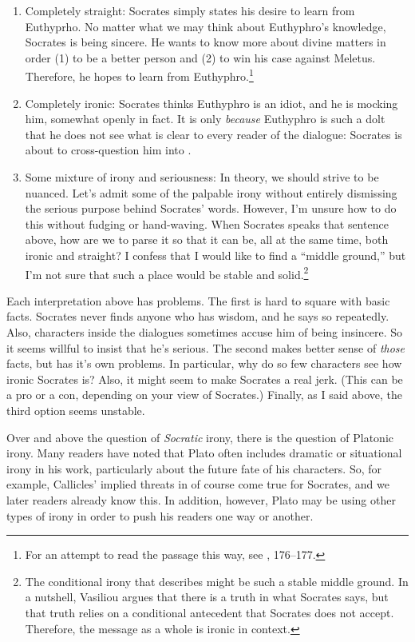 \documentclass[11pt]{article}
\begin{document}
\begin{enumerate}

    \item Completely straight: Socrates simply states his desire to learn from Euthyprho.  No matter what we may think about Euthyphro's knowledge, Socrates is being sincere.  He wants to know more about divine matters in order (1) to be a better person and (2) to win his case against Meletus.  Therefore, he hopes to learn from Euthyphro.\footnote{For an attempt to read the passage this way, see \citet{wolfsdorf2007}, 176--177.}

    \item Completely ironic: Socrates thinks Euthyphro is an idiot, and he is mocking him, somewhat openly in fact.  It is only \emph{because} Euthyphro is such a dolt that he does not see what is clear to every reader of the dialogue: Socrates is about to cross-question him into .

    \item Some mixture of irony and seriousness: In theory, we should strive to be nuanced.  Let's admit some of the palpable irony without entirely dismissing the serious purpose behind Socrates' words.  However, I'm unsure how to do this without fudging or hand-waving.  When Socrates speaks that sentence above, how are we to parse it so that it can be, all at the same time, both ironic and straight?  I confess that I would like to find a ``middle ground,'' but I'm not sure that such a place would be stable and solid.\footnote{The conditional irony that \citet{vasiliou1998} describes might be such a stable middle ground.  In a nutshell, Vasiliou argues that there is a truth in what Socrates says, but that truth relies on a conditional antecedent that Socrates does not accept.  Therefore, the message as a whole is ironic in context.}

\end{enumerate}

Each interpretation above has problems.  The first is hard to square with basic facts.  Socrates never finds anyone who has wisdom, and he says so repeatedly.  Also, characters inside the dialogues sometimes accuse him of being insincere.  So it seems willful to insist that he's serious.  The second makes better sense of \emph{those} facts, but has it's own problems.  In particular, why do so few characters see how ironic Socrates is?  Also, it might seem to make Socrates a real jerk.  (This can be a pro or a con, depending on your view of Socrates.)  Finally, as I said above, the third option seems unstable.

Over and above the question of \emph{Socratic} irony, there is the question of Platonic irony.  Many readers have noted that Plato often includes dramatic or situational irony in his work, particularly about the future fate of his characters.  So, for example, Callicles' implied threats in  of course come true for Socrates, and we later readers already know this.  In addition, however, Plato may be using other types of irony in order to push his readers one way or another.



\newpage


\end{document}
